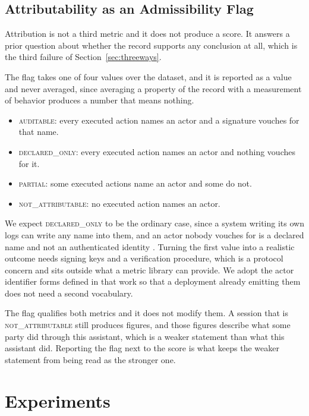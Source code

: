 \documentclass[11pt,a4paper]{article}
\begin{document}
\subsection{Attributability as an Admissibility Flag}
\label{sec:attributability}

Attribution is not a third metric and it does not produce a score. It answers a
prior question about whether the record supports any conclusion at all, which is the
third failure of Section~\ref{sec:threeways}.

The flag takes one of four values over the dataset, and it is reported as a value
and never averaged, since averaging a property of the record with a measurement of
behavior produces a number that means nothing.

\begin{itemize}
  \item \textsc{auditable}: every executed action names an actor and a signature
  vouches for that name.
  \item \textsc{declared\_only}: every executed action names an actor and nothing
  vouches for it.
  \item \textsc{partial}: some executed actions name an actor and some do not.
  \item \textsc{not\_attributable}: no executed action names an actor.
\end{itemize}

We expect \textsc{declared\_only} to be the ordinary case, since a system writing
its own logs can write any name into them, and an actor nobody vouches for is a
declared name and not an authenticated identity \citep{gaussiaboltzmann}. Turning
the first value into a realistic outcome needs signing keys and a verification
procedure, which is a protocol concern and sits outside what a metric library can
provide. We adopt the actor identifier forms defined in that work so that a
deployment already emitting them does not need a second vocabulary.

The flag qualifies both metrics and it does not modify them. A session that is
\textsc{not\_attributable} still produces figures, and those figures describe what
some party did through this assistant, which is a weaker statement than what this
assistant did. Reporting the flag next to the score is what keeps the weaker
statement from being read as the stronger one.

\section{Experiments}
\label{sec:experiments}
\end{document}
